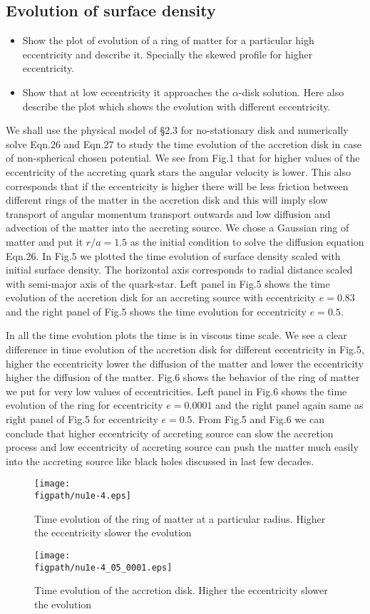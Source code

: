 \documentclass[useAMS,usenatbib]{mn2e}
\newcommand{\figpath}{./Figs/}
\begin{document}
\subsection{Evolution of surface density}
\begin{itemize}
\item Show the plot of evolution of a ring of matter for a particular high
  eccentricity and describe it. Specially the skewed profile for
  higher eccentricity. 
\item Show that at low eccentricity it approaches the $\alpha$-disk
  solution. Here also describe the plot which shows the evolution with
  different eccentricity. 
\end{itemize}
We shall use the physical model of \S2.3 for no-stationary disk and numerically solve Eqn.26 and Eqn.27 to study the time evolution of the accretion disk in case of non-spherical chosen potential. We see from Fig.1 that for higher values of the eccentricity of the accreting quark stars the angular velocity is lower. This also corresponds that if the eccentricity is higher there will be less friction between different rings of the matter in the accretion disk and this will imply slow transport of angular momentum transport outwards and low diffusion and advection of the matter into the accreting source. We chose a Gaussian ring of matter and put it $r/a = 1.5$ as the initial condition to solve the diffusion equation Eqn.26. In Fig.5 we plotted the time evolution of surface density scaled with initial surface density. The horizontal axis corresponds to radial distance scaled with semi-major axis of the quark-star. Left panel in Fig.5 shows the time evolution of the accretion disk for an accreting source with eccentricity $e = 0.83$ and the right panel of Fig.5 shows the time evolution for eccentricity $e = 0.5$. 

In all the time evolution plots the time is in viscous time scale. We see a clear difference in time evolution of the accretion disk for different eccentricity in Fig.5, higher the eccentricity lower the diffusion of the matter and lower the eccentricity higher the diffusion of the matter. Fig.6 shows the behavior of the ring of matter we put for very low values of eccentricities. Left panel in Fig.6 shows the time evolution of the ring for eccentricity $e = 0.0001$ and the right panel again same as right panel of Fig.5 for eccentricity $e = 0.5$. From Fig.5 and Fig.6 we can conclude that higher eccentricity of accreting source can slow the accretion process and low eccentricity of accreting source can push the matter much easily into the accreting source like black holes discussed in last few decades.  
\begin{figure}
\centering
\texttt{[image: \\figpath/nu1e-4.eps]}
\caption{Time evolution of the ring of matter at a particular radius. Higher the eccentricity slower the evolution}
\label{fig:steadyplt1}
\end{figure}
\begin{figure}
\centering
\texttt{[image: \\figpath/nu1e-4\_05\_0001.eps]}
\caption{Time evolution of the accretion disk. Higher the eccentricity slower the evolution}
\label{fig:steadyplt1}
\end{figure}
\end{document}
